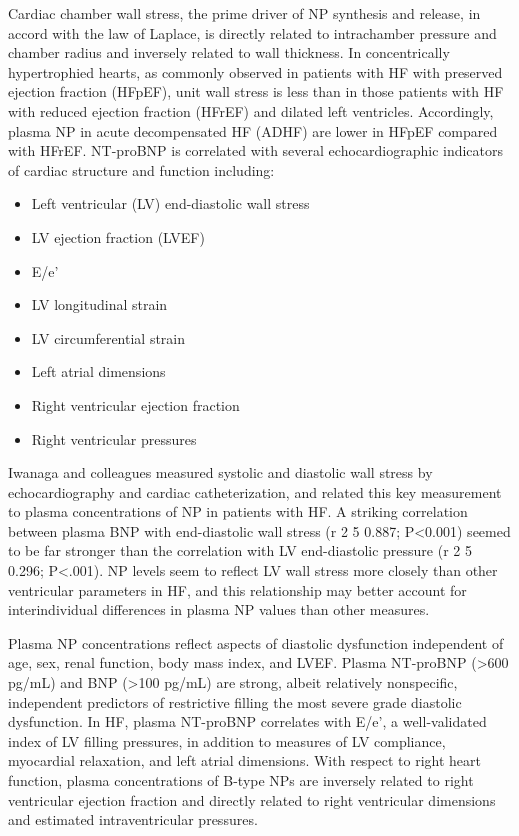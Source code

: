 \documentclass[14pt,a4paper,onecolumn]{extarticle}
\begin{document}
Cardiac chamber wall stress, the prime driver of NP synthesis and release, in accord with the law of Laplace, is directly related to intrachamber pressure and chamber radius and inversely related to wall thickness. In concentrically hypertrophied hearts, as commonly observed in patients with HF with preserved ejection fraction (HFpEF), unit wall stress is less than in those patients with HF with reduced ejection fraction (HFrEF) and dilated left ventricles. Accordingly, plasma NP in acute decompensated HF (ADHF) are lower in HFpEF compared with HFrEF. NT-proBNP is correlated with several echocardiographic indicators of cardiac structure and function including: \begin{itemize}   \item Left ventricular (LV) end-diastolic wall stress   \item LV ejection fraction (LVEF)   \item E/e’   \item LV longitudinal strain   \item LV circumferential strain   \item Left atrial dimensions   \item Right ventricular ejection fraction   \item Right ventricular pressures \end{itemize} \citep{Richards2018} %

Iwanaga and colleagues measured systolic and diastolic wall stress by echocardiography and cardiac catheterization, and related this key measurement to plasma concentrations of NP in patients with HF. A striking correlation between plasma BNP with end-diastolic wall stress (r 2 5 0.887; P<0.001) seemed to be far stronger than the correlation with LV end-diastolic pressure (r 2 5 0.296; P<.001). NP levels seem to reflect LV wall stress more closely than other ventricular parameters in HF, and this relationship may better account for interindividual differences in plasma NP values than other measures. \citep{Iwanaga2006} %

Plasma NP concentrations reflect aspects of diastolic dysfunction independent of age, sex, renal function, body mass index, and LVEF. Plasma NT-proBNP (>600 pg/mL) and BNP (>100 pg/mL) are strong, albeit relatively nonspecific, independent predictors of restrictive filling the most severe grade diastolic dysfunction. In HF, plasma NT-proBNP correlates with E/e’, a well-validated index of LV filling pressures, in addition to measures of LV compliance, myocardial relaxation, and left atrial dimensions. With respect to right heart function, plasma concentrations of B-type NPs are inversely related to right ventricular ejection fraction and directly related to right ventricular dimensions and estimated intraventricular pressures. \citep{Troughton2009} %
\end{document}
